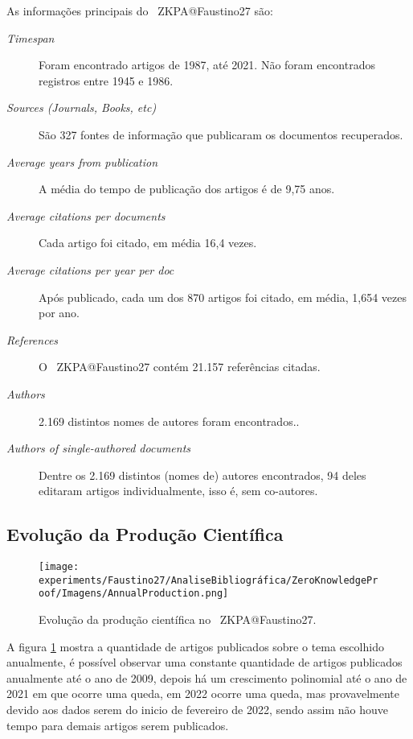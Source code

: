 As informações principais do \dataset\ ZKPA@Faustino27 são:
\begin{description}
    \item [\textit{Timespan}] Foram encontrado artigos de 1987, até 2021. Não foram encontrados registros entre 1945 e 1986.
    \item [\textit{Sources (Journals, Books, etc)}] São 327 fontes de informação que publicaram os documentos recuperados.
    \item [\textit{Average years from publication}] A média do tempo de publicação dos artigos é de 9,75 anos.
    \item [\textit{Average citations per documents}] Cada artigo foi citado, em média 16,4 vezes.
    \item [\textit{Average citations per year per doc}] Após publicado, cada um dos 870 artigos foi citado, em média, 1,654 vezes por ano.
    \item [\textit{References}] O \dataset\ ZKPA@Faustino27 contém 21.157 referências citadas.
    \item [\textit{Authors}] 2.169 distintos nomes de autores foram encontrados..
    \item [\textit{Authors of single-authored documents}] Dentre os 2.169 distintos (nomes de) autores encontrados, 94 deles editaram artigos individualmente, isso é, sem co-autores.
\end{description}

\subsection{Evolução da Produção Científica}

\begin{figure}
    \centering
    \texttt{[image: experiments/Faustino27/AnaliseBibliográfica/ZeroKnowledgeProof/Imagens/AnnualProduction.png]}
    \caption{Evolução da produção científica no \dataset\   ZKPA@Faustino27.}
    \label{fig:evol:anual:ZKPA@Faustino27}
\end{figure}

A figura \ref{fig:evol:anual:ZKPA@Faustino27} mostra a quantidade de artigos publicados sobre o tema escolhido anualmente, é possível observar uma constante quantidade de artigos publicados anualmente até o ano de 2009, depois há um crescimento polinomial até o ano de 2021 em que ocorre uma queda, em 2022 ocorre uma queda, mas provavelmente devido aos dados serem do inicio de fevereiro de 2022, sendo assim não houve tempo para demais artigos serem publicados.

